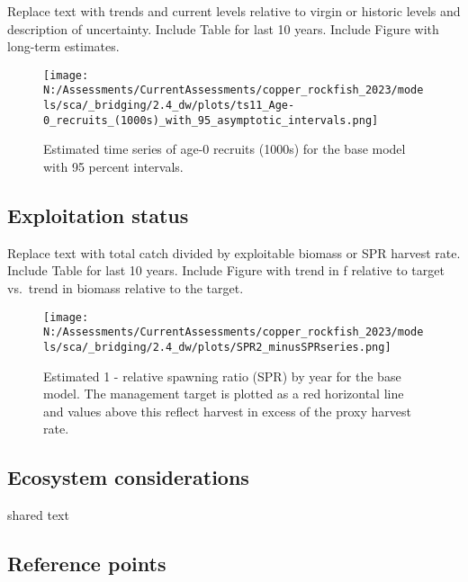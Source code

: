 \documentclass[11pt,
  english,
  letterpaper,
]{article}
\begin{document}
Replace text with trends and current levels relative to virgin or historic levels and description of uncertainty. Include Table for last 10 years. Include Figure with long-term estimates.



\begin{figure}
\centering
\texttt{[image: N:/Assessments/CurrentAssessments/copper\_rockfish\_2023/models/sca/\_bridging/2.4\_dw/plots/ts11\_Age-0\_recruits\_(1000s)\_with\_95\_asymptotic\_intervals.png]}
\caption{Estimated time series of age-0 recruits (1000s) for the base model with 95 percent intervals.\label{fig:es-recruits}}
\end{figure}

\clearpage

\hypertarget{exploitation-status}{%
\subsection*{Exploitation status}\label{exploitation-status}}

Replace text with total catch divided by exploitable biomass or SPR harvest rate. Include Table for last 10 years. Include Figure with trend in f relative to target vs.~trend in biomass relative to the target.



\begin{figure}
\centering
\texttt{[image: N:/Assessments/CurrentAssessments/copper\_rockfish\_2023/models/sca/\_bridging/2.4\_dw/plots/SPR2\_minusSPRseries.png]}
\caption{Estimated 1 - relative spawning ratio (SPR) by year for the base model. The management target is plotted as a red horizontal line and values above this reflect harvest in excess of the proxy harvest rate.\label{fig:es-1-spr}}
\end{figure}

\hypertarget{ecosystem-considerations}{%
\subsection*{Ecosystem considerations}\label{ecosystem-considerations}}

shared text

\hypertarget{reference-points}{%
\subsection*{Reference points}\label{reference-points}}
\end{document}
